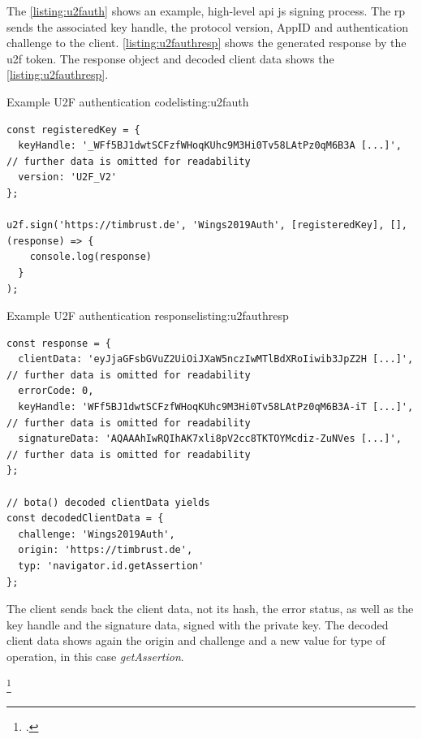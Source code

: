 The \autoref{listing:u2fauth} shows an example, high-level \gls{api} \gls{js} signing process. The \gls{rp} sends the associated key handle, the protocol version, AppID and authentication challenge to the client. \autoref{listing:u2fauthresp} shows the generated response by the \gls{u2f} token. The response object and decoded client data shows the \autoref{listing:u2fauthresp}.
\\
\begin{example}{Example U2F authentication code}{listing:u2fauth}
\begin{verbatim}
const registeredKey = {
  keyHandle: '_WFf5BJ1dwtSCFzfWHoqKUhc9M3Hi0Tv58LAtPz0qM6B3A [...]', // further data is omitted for readability
  version: 'U2F_V2'
};

u2f.sign('https://timbrust.de', 'Wings2019Auth', [registeredKey], [], (response) => {
    console.log(response)
  }
);
\end{verbatim}
\end{example}

\begin{example}{Example U2F authentication response}{listing:u2fauthresp}
\begin{verbatim}
const response = {
  clientData: 'eyJjaGFsbGVuZ2UiOiJXaW5nczIwMTlBdXRoIiwib3JpZ2H [...]', // further data is omitted for readability
  errorCode: 0,
  keyHandle: 'WFf5BJ1dwtSCFzfWHoqKUhc9M3Hi0Tv58LAtPz0qM6B3A-iT [...]', // further data is omitted for readability
  signatureData: 'AQAAAhIwRQIhAK7xli8pV2cc8TKTOYMcdiz-ZuNVes [...]', // further data is omitted for readability
};

// bota() decoded clientData yields
const decodedClientData = {
  challenge: 'Wings2019Auth',
  origin: 'https://timbrust.de',
  typ: 'navigator.id.getAssertion'
};
\end{verbatim}
\end{example}

The client sends back the client data, not its hash, the error status, as well as the key handle and the signature data, signed with the private key. The decoded client data shows again the origin and challenge and a new value for type of operation, in this case \textit{getAssertion}.

\footcites[See][1--2, 4]{u2f-overview}[See][4]{u2f-js-api}